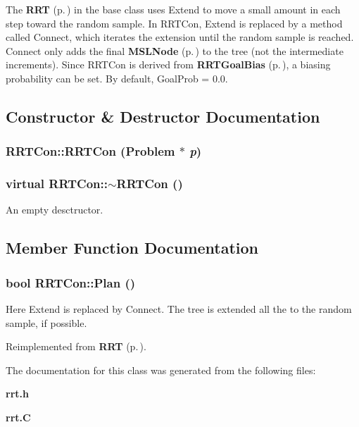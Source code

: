 The {\bf RRT} {\rm (p.\,\pageref{classRRT})} in the base class uses Extend to move a small amount in each step toward the random sample. In RRTCon, Extend is replaced by a method called Connect, which iterates the extension until the random sample is reached. Connect only adds the final  {\bf MSLNode} {\rm (p.\,\pageref{classMSLNode})} to the tree (not the intermediate increments). Since RRTCon is derived from {\bf RRTGoal\-Bias} {\rm (p.\,\pageref{classRRTGoalBias})}, a biasing probability can be set. By default, Goal\-Prob = 0.0. 



\subsection{Constructor \& Destructor Documentation}
\subsubsection{\setlength{\rightskip}{0pt plus 5cm}RRTCon::RRTCon ({\bf Problem} $\ast$ {\em p})}\label{classRRTCon_a0}


\subsubsection{\setlength{\rightskip}{0pt plus 5cm}virtual RRTCon::$\sim$RRTCon ()\hspace{0.3cm}{\tt  [inline, virtual]}}\label{classRRTCon_a1}


An empty desctructor.



\subsection{Member Function Documentation}
\subsubsection{\setlength{\rightskip}{0pt plus 5cm}bool RRTCon::Plan ()\hspace{0.3cm}{\tt  [virtual]}}\label{classRRTCon_a2}


Here Extend is replaced by Connect. The tree is extended all the to the random sample, if possible.



Reimplemented from {\bf RRT} {\rm (p.\,\pageref{classRRT_a3})}.

The documentation for this class was generated from the following files:\begin{CompactItemize}
\item 
{\bf rrt.h}\item 
{\bf rrt.C}\end{CompactItemize}
